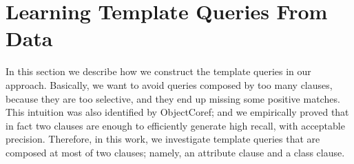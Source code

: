 \section{Learning Template Queries From Data}


In this section we describe how we construct the template queries in our approach. Basically, we want to avoid queries composed by too many clauses, because they are too selective, and they end up missing some positive matches. This intuition was also identified by ObjectCoref\cite{DBLP:conf/www/HuCQ11}; and we empirically proved that in fact two clauses are enough to efficiently generate high recall, with acceptable precision. Therefore, in this work, we investigate template queries that are composed at most of two clauses; namely, an attribute clause and a class clause. 

